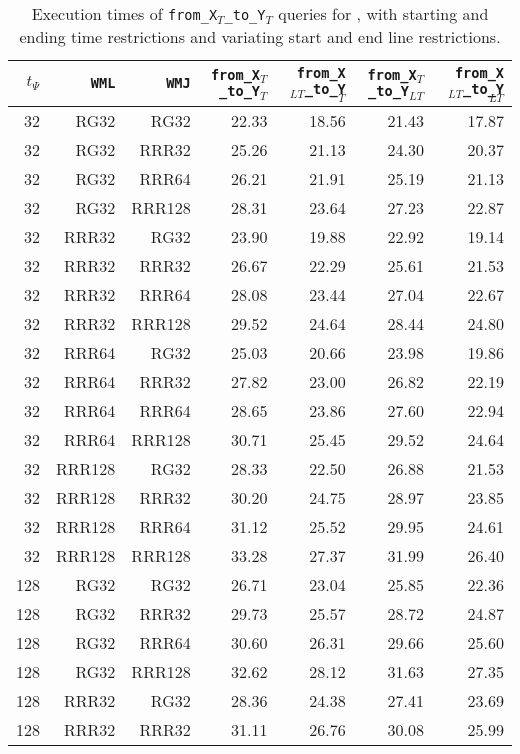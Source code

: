 \begin{table}
\caption{Execution times of \texttt{from\_X$_T$\_to\_Y$_T$} queries for \ctr, with starting and ending time restrictions and variating start and end line restrictions.}
\begin{tabular}{|r|r|r|r|r|r|r|}
\hline
$t_{\Psi}$ & \texttt{WML} & \texttt{WMJ} & \texttt{from\_X$_{T}$\_to\_Y$_{T}$} & \texttt{from\_X$_{LT}$\_to\_Y$_{T}$} & \texttt{from\_X$_{T}$\_to\_Y$_{LT}$} & \texttt{from\_X$_{LT}$\_to\_Y$_{LT}$} \\
\hline
32 & RG32 & RG32 & 22.33 & 18.56 & 21.43 & 17.87 \\
32 & RG32 & RRR32 & 25.26 & 21.13 & 24.30 & 20.37 \\
32 & RG32 & RRR64 & 26.21 & 21.91 & 25.19 & 21.13 \\
32 & RG32 & RRR128 & 28.31 & 23.64 & 27.23 & 22.87 \\
32 & RRR32 & RG32 & 23.90 & 19.88 & 22.92 & 19.14 \\
32 & RRR32 & RRR32 & 26.67 & 22.29 & 25.61 & 21.53 \\
32 & RRR32 & RRR64 & 28.08 & 23.44 & 27.04 & 22.67 \\
32 & RRR32 & RRR128 & 29.52 & 24.64 & 28.44 & 24.80 \\
32 & RRR64 & RG32 & 25.03 & 20.66 & 23.98 & 19.86 \\
32 & RRR64 & RRR32 & 27.82 & 23.00 & 26.82 & 22.19 \\
32 & RRR64 & RRR64 & 28.65 & 23.86 & 27.60 & 22.94 \\
32 & RRR64 & RRR128 & 30.71 & 25.45 & 29.52 & 24.64 \\
32 & RRR128 & RG32 & 28.33 & 22.50 & 26.88 & 21.53 \\
32 & RRR128 & RRR32 & 30.20 & 24.75 & 28.97 & 23.85 \\
32 & RRR128 & RRR64 & 31.12 & 25.52 & 29.95 & 24.61 \\
32 & RRR128 & RRR128 & 33.28 & 27.37 & 31.99 & 26.40 \\
128 & RG32 & RG32 & 26.71 & 23.04 & 25.85 & 22.36 \\
128 & RG32 & RRR32 & 29.73 & 25.57 & 28.72 & 24.87 \\
128 & RG32 & RRR64 & 30.60 & 26.31 & 29.66 & 25.60 \\
128 & RG32 & RRR128 & 32.62 & 28.12 & 31.63 & 27.35 \\
128 & RRR32 & RG32 & 28.36 & 24.38 & 27.41 & 23.69 \\
128 & RRR32 & RRR32 & 31.11 & 26.76 & 30.08 & 25.99 \\

\end{tabular}
\end{table}
